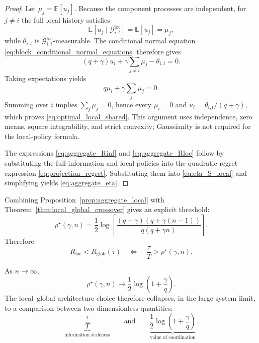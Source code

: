 \documentclass[11pt]{article}
\begin{document}
\begin{proof}
Let $\mu_j=\mathbb E[u_j]$. Because the component processes are independent,
for $j\ne i$ the full local history satisfies
\[
\mathbb E[u_j\mid\mathcal G^{\mathrm{loc}}_{i,t}]
=\mathbb E[u_j]=\mu_j,
\]
while $\theta_{i,t}$ is
$\mathcal G^{\mathrm{loc}}_{i,t}$-measurable. The conditional normal equation
\eqref{eq:block_conditional_normal_equations} therefore gives
\[
(q+\gamma)u_i
+\gamma\sum_{j\ne i}\mu_j
-\theta_{i,t}=0.
\]
Taking expectations yields
\[
q\mu_i+\gamma\sum_j\mu_j=0.
\]
Summing over $i$ implies $\sum_j\mu_j=0$, hence every $\mu_i=0$ and
$u_i=\theta_{i,t}/(q+\gamma)$, which proves
\eqref{eq:optimal_local_shared}. This argument uses independence, zero means,
square integrability, and strict convexity; Gaussianity is not required for the
local-policy formula.

The expressions \eqref{eq:aggregate_Rinf} and
\eqref{eq:aggregate_Rloc} follow by substituting the full-information and
local policies into the quadratic regret expression
\eqref{eq:projection_regret}. Substituting them into
\eqref{eq:eta_S_local} and simplifying yields
\eqref{eq:aggregate_eta}.
\end{proof}

Combining Proposition~\ref{prop:aggregate_local} with
Theorem~\ref{thm:local_global_crossover} gives an explicit threshold:
\begin{equation}
    \boxed{
    \rho^\star(\gamma,n)
    =
    \frac{1}{2}
    \log
    \left[
        \frac{
            (q+\gamma)
            \left(
                q+\gamma(n-1)
            \right)
        }{
            q(q+\gamma n)
        }
    \right].
    }
    \label{eq:aggregate_rho_star}
\end{equation}
Therefore
\begin{equation}
    R_{\mathrm{loc}}
    <
    R_{\mathrm{glob}}(\tau)
    \quad\Longleftrightarrow\quad
    \frac{\tau}{T}
    >
    \rho^\star(\gamma,n).
    \label{eq:aggregate_crossover}
\end{equation}

As $n\rightarrow\infty$,
\begin{equation}
    \boxed{
    \rho^\star(\gamma,n)
    \longrightarrow
    \frac{1}{2}
    \log
    \left(
        1+\frac{\gamma}{q}
    \right).
    }
    \label{eq:large_n_threshold}
\end{equation}
The local--global architecture choice therefore collapses, in the
large-system limit, to a comparison between two dimensionless quantities:
\begin{equation}
    \boxed{
    \underbrace{\frac{\tau}{T}}_{\text{information staleness}}
    \qquad\text{and}\qquad
    \underbrace{
        \frac{1}{2}
        \log
        \left(
            1+\frac{\gamma}{q}
        \right)
    }_{\text{value of coordination}}.
    }
    \label{eq:two_dimensionless_quantities}
\end{equation}
\end{document}
